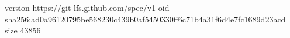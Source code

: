 version https://git-lfs.github.com/spec/v1
oid sha256:ad0a96120795be568230c439b0af5450330ff6c71b4a31f6d4e7fc1689d23acd
size 43856
